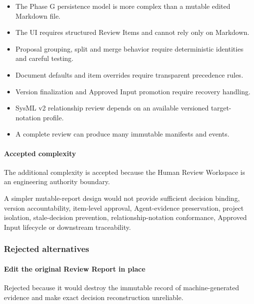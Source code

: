 \begin{itemize}
\tightlist
\item
  The Phase G persistence model is more complex than a mutable edited Markdown file.
\item
  The UI requires structured Review Items and cannot rely only on Markdown.
\item
  Proposal grouping, split and merge behavior require deterministic identities and careful testing.
\item
  Document defaults and item overrides require transparent precedence rules.
\item
  Version finalization and Approved Input promotion require recovery handling.
\item
  SysML v2 relationship review depends on an available versioned target-notation profile.
\item
  A complete review can produce many immutable manifests and events.
\end{itemize}

\hypertarget{accepted-complexity}{%
\paragraph{Accepted complexity}\label{accepted-complexity}}

The additional complexity is accepted because the Human Review Workspace is an engineering authority boundary.

A simpler mutable-report design would not provide sufficient decision binding, version accountability, item-level approval, Agent-evidence preservation, project isolation, stale-decision prevention, relationship-notation conformance, Approved Input lifecycle or downstream traceability.

\hypertarget{rejected-alternatives-1}{%
\subsubsection{Rejected alternatives}\label{rejected-alternatives-1}}

\hypertarget{edit-the-original-review-report-in-place}{%
\paragraph{Edit the original Review Report in place}\label{edit-the-original-review-report-in-place}}

Rejected because it would destroy the immutable record of machine-generated evidence and make exact decision reconstruction unreliable.

